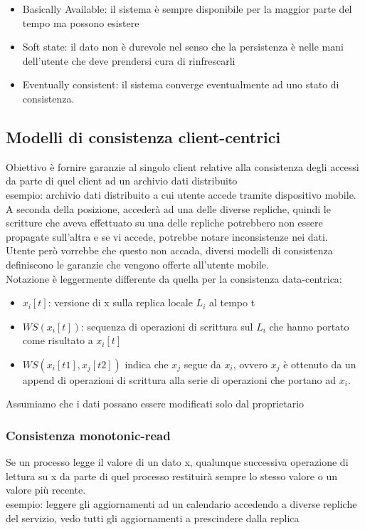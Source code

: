 \documentclass{article}
\begin{document}
\begin{itemize}
\item Basically Available: il sistema è sempre disponibile per la maggior parte del tempo ma possono esistere
\item Soft state: il dato non è durevole nel senso che la persistenza è nelle mani dell'utente che deve prendersi cura di rinfrescarli
\item Eventually consistent: il sistema converge eventualmente ad uno stato di consistenza.
\end{itemize}
\subsection{Modelli di consistenza client-centrici}
Obiettivo è fornire garanzie al singolo client relative alla consistenza degli accessi da parte di quel client ad un archivio dati distribuito\\ esempio: archivio dati distribuito a cui utente accede tramite dispositivo mobile. A seconda della posizione, accederà ad una delle diverse repliche, quindi le scritture che aveva effettuato su una delle repliche potrebbero non essere propagate sull'altra e se vi accede, potrebbe notare inconsistenze nei dati.\\ Utente però vorrebbe che questo non accada, diversi modelli di consistenza definiscono le garanzie che vengono offerte all'utente mobile.\\ Notazione è leggermente differente da quella per la consistenza data-centrica:
\begin{itemize}
\item $x_i[t]$: versione di x sulla replica locale $L_i$ al tempo t
\item $WS(x_i[t])$: sequenza di operazioni di scrittura sul $L_i$ che hanno portato come risultato a $x_i[t]$
\item $WS(x_i[t1], x_j[t2])$ indica che $x_j$ segue da $x_i$, ovvero $x_j$ è ottenuto da un append di operazioni di scrittura alla serie di operazioni che portano ad $x_i$.
\end{itemize}
Assumiamo che i dati possano essere modificati solo dal proprietario
\subsubsection{Consistenza monotonic-read}
Se un processo legge il valore di un dato x, qualunque successiva operazione di lettura su x da parte di quel processo restituirà sempre lo stesso valore o un valore più recente.\\ esempio: leggere gli aggiornamenti ad un calendario accedendo a diverse repliche del servizio, vedo tutti gli aggiornamenti a prescindere dalla replica
\end{document}
